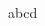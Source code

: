 \documentclass{article}
\begin{document}
\begin{CJK*}{UTF8}{song}

  \begin{usecase}
    abcd
  \end{usecase}

\end{CJK*}
\end{document}
